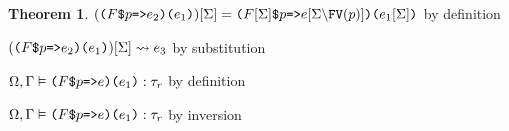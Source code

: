 \documentclass[acmsmall]{acmart}
\theoremstyle{definition}
\newtheorem{theorem}{Theorem}[section]
\begin{document}
\begin{theorem}
        \item \Z\Z\Z $(\texttt{($F$\$$p$=>$e_2$)($e_1$)})[\Sigma] = \texttt{($F[\Sigma]$\$$p$=>$e[\Sigma\backslash\text{FV}(p)]$)($e_1[\Sigma]$)}
        $ by definition
        \item \Z\Z\Z $(\texttt{($F$\$$p$=>$e_2$)($e_1$)})[\Sigma] \rightsquigarrow e_3$ by substitution 

        \item \Z\Z\Z $\Omega, \Gamma \vDash \texttt{($F$\$$p$=>$e$)($e_1$)} : \tau_r$ by definition
      \item \Z\Z $\Omega, \Gamma \vDash \texttt{($F$\$$p$=>$e$)($e_1$)} : \tau_r$ by inversion 



\end{theorem}
\end{document}
